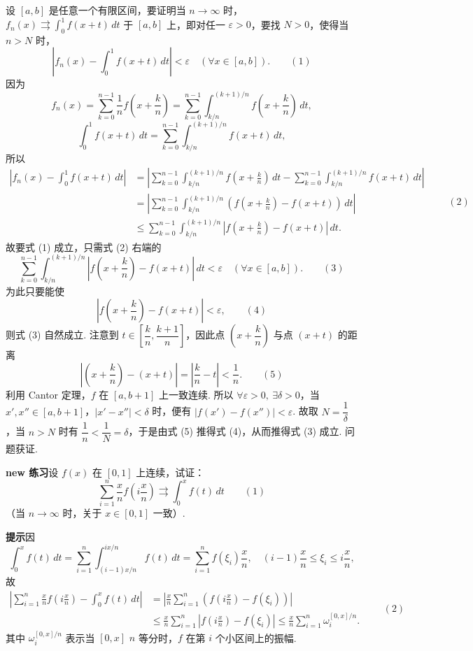 \documentclass[UTF8,12pt,a4paper,fontset=fandol]{ctexart}
\begin{document}
设 $[a,b]$ 是任意一个有限区间，要证明当 $n\to\infty$ 时，
$f_n(x)\rightrightarrows\displaystyle\int_0^1f(x+t)\,dt$ 于 $[a,b]$ 上，即对任一
$\varepsilon>0$，要找 $N>0$，使得当 $n>N$ 时，
\[
  \left|f_n(x)-\int_0^1f(x+t)\,dt\right|<\varepsilon\quad(\forall x\in[a,b]).
\qquad(1)
\]
因为
\[
  f_n(x)=\sum_{k=0}^{n-1}\frac1n f\left(x+\frac{k}{n}\right)
  =\sum_{k=0}^{n-1}\int_{k/n}^{(k+1)/n}f\left(x+\frac{k}{n}\right)\,dt,
\]
\[
  \int_0^1f(x+t)\,dt
  =\sum_{k=0}^{n-1}\int_{k/n}^{(k+1)/n}f(x+t)\,dt,
\]
所以
\begin{equation}
\begin{aligned}
\left|f_n(x)-\int_0^1f(x+t)\,dt\right|
&=\left|\sum_{k=0}^{n-1}\int_{k/n}^{(k+1)/n}f\left(x+\frac{k}{n}\right)\,dt
 -\sum_{k=0}^{n-1}\int_{k/n}^{(k+1)/n}f(x+t)\,dt\right|\\
&=\left|\sum_{k=0}^{n-1}\int_{k/n}^{(k+1)/n}
\left(f\left(x+\frac{k}{n}\right)-f(x+t)\right)\,dt\right|\\
&\le\sum_{k=0}^{n-1}\int_{k/n}^{(k+1)/n}
\left|f\left(x+\frac{k}{n}\right)-f(x+t)\right|\,dt.
\end{aligned}
\qquad(2)
\end{equation}
故要式 (1) 成立，只需式 (2) 右端的
\[
  \sum_{k=0}^{n-1}\int_{k/n}^{(k+1)/n}
  \left|f\left(x+\frac{k}{n}\right)-f(x+t)\right|\,dt<\varepsilon
  \quad(\forall x\in[a,b]).
\qquad(3)
\]
为此只要能使
\[
  \left|f\left(x+\frac{k}{n}\right)-f(x+t)\right|<\varepsilon,
\qquad(4)
\]
则式 (3) 自然成立. 注意到 $t\in\left[\dfrac{k}{n},\dfrac{k+1}{n}\right]$，因此点
$\left(x+\dfrac{k}{n}\right)$ 与点 $(x+t)$ 的距离
\[
  \left|\left(x+\frac{k}{n}\right)-(x+t)\right|
  =\left|\frac{k}{n}-t\right|<\frac1n.
\qquad(5)
\]
利用 Cantor 定理，$f$ 在 $[a,b+1]$ 上一致连续. 所以 $\forall\varepsilon>0,\ \exists\delta>0$，当
$x',x''\in[a,b+1]$，$|x'-x''|<\delta$ 时，便有
$|f(x')-f(x'')|<\varepsilon$. 故取 $N=\dfrac1\delta$，当 $n>N$ 时有
$\dfrac1n<\dfrac1N=\delta$，于是由式 (5) 推得式 (4)，从而推得式 (3) 成立. 问题获证.

\noindent\textbf{new 练习}\quad 设 $f(x)$ 在 $[0,1]$ 上连续，试证：
\[
  \sum_{i=1}^n\frac{x}{n}f\left(i\frac{x}{n}\right)\rightrightarrows\int_0^xf(t)\,dt
\qquad(1)
\]
（当 $n\to\infty$ 时，关于 $x\in[0,1]$ 一致）.

\noindent\textbf{提示}\quad 因
\[
  \int_0^xf(t)\,dt=\sum_{i=1}^n\int_{(i-1)x/n}^{ix/n}f(t)\,dt
  =\sum_{i=1}^n f(\xi_i)\frac{x}{n},\quad (i-1)\frac{x}{n}\le\xi_i\le i\frac{x}{n},
\]
故
\begin{equation}
\begin{aligned}
\left|\sum_{i=1}^n\frac{x}{n}f\left(i\frac{x}{n}\right)-\int_0^xf(t)\,dt\right|
&=\left|\frac{x}{n}\sum_{i=1}^n\left(f\left(i\frac{x}{n}\right)-f(\xi_i)\right)\right|\\
&\le\frac{x}{n}\sum_{i=1}^n\left|f\left(i\frac{x}{n}\right)-f(\xi_i)\right|
\le \frac{x}{n}\sum_{i=1}^n\omega_i^{[0,x]/n}.
\end{aligned}
\qquad(2)
\end{equation}
其中 $\omega_i^{[0,x]/n}$ 表示当 $[0,x]$ $n$ 等分时，$f$ 在第 $i$ 个小区间上的振幅.
\end{document}
